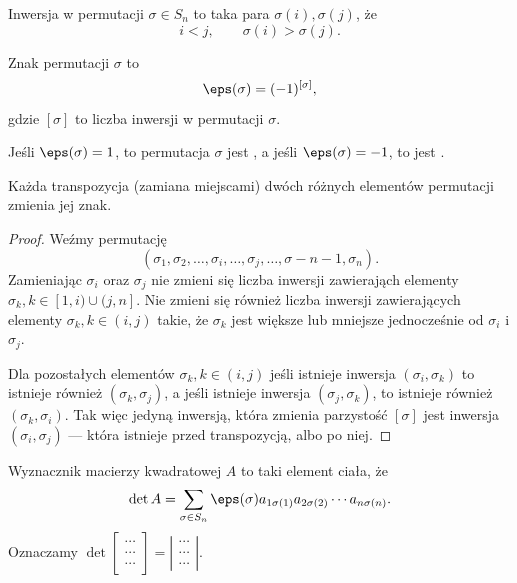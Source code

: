 \begin{definition}
    Inwersja w permutacji $\sigma \in S_n$ to taka para $\sigma(i), \sigma(j)$, że
    \[ i < j, \qquad \sigma(i) > \sigma(j). \]
\end{definition}

\begin{definition}
    Znak permutacji $\sigma$ to
    \[ \eps(\sigma) = (-1)^{[\sigma]}, \]
    gdzie $[\sigma]$ to liczba inwersji w permutacji $\sigma$.
\end{definition}

Jeśli $\eps(\sigma) = 1$, to permutacja $\sigma$ jest , a jeśli  $\eps(\sigma) = -1$, to jest .

\begin{fact}
    \label{f:sign of transposition}
    Każda transpozycja (zamiana miejscami) dwóch różnych elementów permutacji zmienia jej znak.
\end{fact}
\begin{proof}
    Weźmy permutację
    \[ (\sigma_1, \sigma_2, \ldots, \sigma_i, \ldots, \sigma_j, \ldots, \sigma-{n-1}, \sigma_n). \]
    Zamieniając $\sigma_i$ oraz $\sigma_j$ nie zmieni się liczba inwersji zawierająch elementy $\sigma_k, k \in [1,i)\cup(j,n]$. Nie zmieni się również liczba inwersji zawierających elementy $\sigma_k, k \in (i,j)$ takie, że $\sigma_k$ jest większe lub mniejsze jednocześnie od $\sigma_i$ i $\sigma_j$.

    Dla pozostałych elementów $\sigma_k, k \in (i, j)$ jeśli istnieje inwersja $(\sigma_i, \sigma_k)$ to istnieje również $(\sigma_k, \sigma_j)$, a jeśli istnieje inwersja $(\sigma_j, \sigma_k)$, to istnieje również $(\sigma_k, \sigma_i)$. Tak więc jedyną inwersją, która zmienia parzystość $[\sigma]$ jest inwersja $(\sigma_i, \sigma_j)$ --- która istnieje przed transpozycją, albo po niej.
\end{proof}

\begin{definition}
    Wyznacznik macierzy kwadratowej $A$ to taki element ciała, że
    \[ \det A = \sum_{\sigma\in S_n} \eps(\sigma)a_{1\sigma(1)}a_{2\sigma(2)}\cdots a_{n\sigma(n)}. \]
    Oznaczamy $\det
    \left[\begin{smallmatrix}
        \cdots \\ \cdots \\ \cdots
    \end{smallmatrix}\right] =
    \left|\begin{smallmatrix}
        \cdots \\ \cdots \\ \cdots
    \end{smallmatrix}\right|$.
\end{definition}

